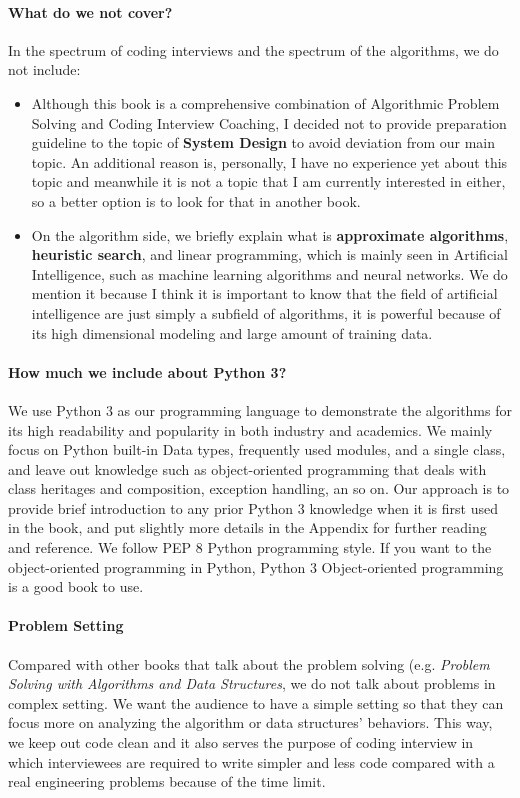 \documentclass[../main.tex]{subfiles}
\begin{document}
\paragraph{What do we not cover?} In the spectrum of coding interviews and the spectrum of the algorithms, we do not include:
\begin{itemize}
    \item Although this book is a comprehensive combination of Algorithmic Problem Solving and Coding Interview Coaching, I decided not to provide preparation guideline to the topic of \textbf{System Design} to avoid deviation from our main topic. An additional reason is, personally, I have no experience yet about this topic and meanwhile it is not a topic that I am currently interested in either, so a better option is to look for that in another book. 
\item On the algorithm side, we briefly explain what is \textbf{approximate algorithms}, \textbf{heuristic search}, and linear programming, which is mainly seen in Artificial Intelligence, such as machine learning algorithms and neural networks. We do mention it because I think it is important to know that the field of artificial intelligence are just simply a subfield of algorithms, it is powerful because of its high dimensional modeling and large amount of training data. 

\end{itemize}
\paragraph{How much we include about Python 3? } We use Python 3 as our programming language to demonstrate the algorithms for its high readability and popularity in both industry and academics. We mainly focus on Python built-in Data types, frequently used modules, and a single class, and leave out knowledge such as object-oriented programming that deals with class heritages and composition, exception handling, an so on. Our approach is to provide brief introduction to any prior Python 3 knowledge when it is first used in the book, and put slightly more details in the Appendix for further reading and reference. We follow PEP 8 Python programming style. If you want to the object-oriented programming in Python, Python 3 Object-oriented programming is a good book to use. 

\paragraph{Problem Setting} Compared with other books that talk about the problem solving (e.g. \textit{Problem Solving with Algorithms and Data Structures}, we do not talk about problems in complex setting. We want the audience to have a simple setting so that they can focus more on analyzing the algorithm or data structures' behaviors.  This way, we keep out code clean and it also serves the purpose of coding interview in which interviewees are required to write simpler and less code compared with a real engineering problems because of the time limit. 
\end{document}
